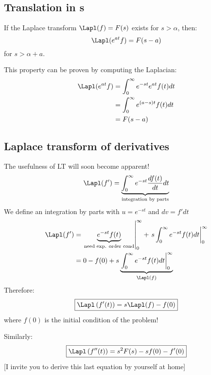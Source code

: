 \subsection{Translation in s}
If the Laplace transform $\Lapl (f)=F(s)$ exists for $s>\alpha$, then:
\begin{equation}
\Lapl (e^{at}f)= F(s-a)
\end{equation}
for $s>\alpha+a$.

This property can be proven by computing the Laplacian:
\begin{align*}
\Lapl (e^{at}f)&= \int^\infty_0 e^{-st}e^{at}f(t) dt\\
&= \int^\infty_0 e^{(a-s)t}f(t) dt\\
&=F(s-a)
\end{align*}


\subsection{Laplace transform of derivatives}
The usefulness of LT will soon become apparent!
\begin{align*}
\Lapl (f')&= \underbrace{\int^\infty_0 e^{-st}\frac{df(t)}{dt} dt}_{\text{integration by parts}}\\
\end{align*}
We define an integration by parts with $u=e^{-st}$ and $dv=f'dt$
\begin{align*}
\Lapl (f')&= \left. \underbrace{e^{-st}f(t)}_\text{need exp. order cond}\right|^\infty_0+\left. s\int^\infty_0e^{-st}f(t) dt\right|^\infty_0\\
&=0 -f(0) + s\underbrace{\left. \int^\infty_0e^{-st}f(t) dt\right|^\infty_0}_{\Lapl(f)}
\end{align*}
Therefore:
\begin{align*}
\boxed{\Lapl \left(f'(t)\right)= s\Lapl(f)-f(0)}
\end{align*}
where $f(0)$ is the initial condition of the problem!


Similarly:
\begin{align*}
\boxed{\Lapl \left(f''(t)\right)= s^2F(s)-s f(0)-f'(0)}
\end{align*}
[I invite you to derive this last equation by yourself at home]

